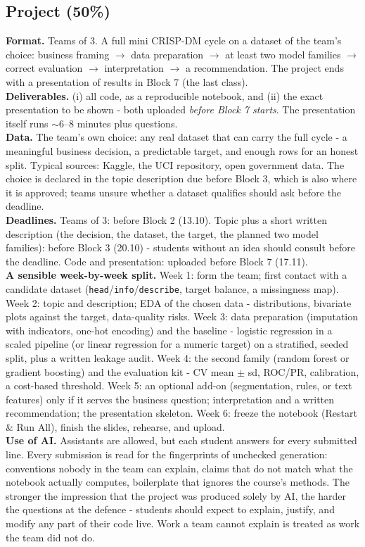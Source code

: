 \documentclass[11pt,a4paper]{article}
\begin{document}
\subsection{Project (50\%)}
\textbf{Format.} Teams of 3. A full mini CRISP-DM cycle on a dataset of the
team's choice: business framing $\rightarrow$ data preparation $\rightarrow$
at least two model families $\rightarrow$ correct evaluation $\rightarrow$
interpretation $\rightarrow$ a recommendation. The project ends with a
presentation of results in Block 7 (the last class).\\
\textbf{Deliverables.} (i) all code, as a reproducible notebook, and (ii) the
exact presentation to be shown - both uploaded \emph{before Block 7 starts}.
The presentation itself runs $\sim$6--8 minutes plus questions.\\
\textbf{Data.} The team's own choice: any real dataset that can carry the
full cycle - a meaningful business decision, a predictable target, and enough
rows for an honest split. Typical sources: Kaggle, the UCI repository, open
government data. The choice is declared in the topic description due before
Block 3, which is also where it is approved; teams unsure whether a dataset
qualifies should ask before the deadline.\\
\textbf{Deadlines.} Teams of 3: before Block 2 (13.10). Topic plus a short
written description (the decision, the dataset, the target, the planned two
model families): before Block 3 (20.10) - students without an idea should
consult before the deadline. Code and presentation: uploaded before Block 7
(17.11).\\
\textbf{A sensible week-by-week split.} Week 1: form the team; first contact
with a candidate dataset (\texttt{head}/\texttt{info}/\texttt{describe},
target balance, a missingness map). Week 2: topic and description; EDA of the
chosen data - distributions, bivariate plots against the target, data-quality
risks. Week 3: data preparation (imputation with indicators, one-hot
encoding) and the baseline - logistic regression in a scaled pipeline (or
linear regression for a numeric target) on a stratified, seeded split, plus a
written leakage audit. Week 4: the second family (random forest or gradient
boosting) and the evaluation kit - CV mean $\pm$ sd, ROC/PR, calibration, a
cost-based threshold. Week 5: an optional add-on (segmentation, rules, or
text features) only if it serves the business question; interpretation and a
written recommendation; the presentation skeleton. Week 6: freeze the
notebook (Restart \& Run All), finish the slides, rehearse, and upload.\\
\textbf{Use of AI.} Assistants are allowed, but each student answers for every
submitted line. Every submission is read for the fingerprints of unchecked
generation: conventions nobody in the team can explain, claims that do not
match what the notebook actually computes, boilerplate that ignores the
course's methods. The stronger the impression that the project was produced
solely by AI, the harder the questions at the defence - students should expect
to explain, justify, and modify any part of their code live. Work a team
cannot explain is treated as work the team did not do.
\end{document}
